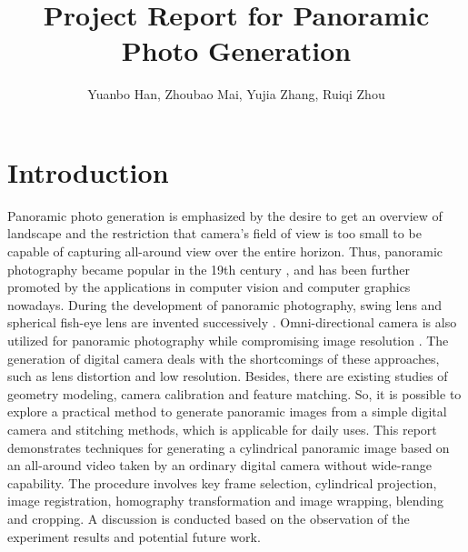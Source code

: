 \documentclass[runningheads]{llncs}
\begin{document}
\pagestyle{headings}
\mainmatter
\def\ECCV16SubNumber{14}  %

\title{Project Report for Panoramic Photo Generation}



\author{Yuanbo Han, %
Zhoubao Mai, %
Yujia Zhang, %
Ruiqi Zhou %
}
\institute{Paper ID \ECCV16SubNumber}

\maketitle


\section{Introduction}

Panoramic photo generation is emphasized by the desire to get an overview of landscape and the restriction that camera's field of view is too small to be capable of capturing all-around view over the entire horizon. Thus, panoramic photography became popular in the 19th century \cite{luhmann2004historical}, and has been further promoted by the applications in computer vision and computer graphics nowadays. During the development of panoramic photography, swing lens and spherical fish-eye lens are invented successively \cite{deng2003generating}. Omni-directional camera is also utilized for panoramic photography while compromising image resolution \cite{nayar1997catadioptric}. The generation of digital camera deals with the shortcomings of these approaches, such as lens distortion and low resolution. Besides, there are existing studies of geometry modeling, camera calibration and feature matching. So, it is possible to explore a practical method to generate panoramic images from a simple digital camera and stitching methods, which is applicable for daily uses. This report demonstrates techniques for generating a cylindrical panoramic image based on an all-around video taken by an ordinary digital camera without wide-range capability. The procedure involves key frame selection, cylindrical projection, image registration, homography transformation and image wrapping, blending and cropping. A discussion is conducted based on the observation of the experiment results and potential future work.
\end{document}
